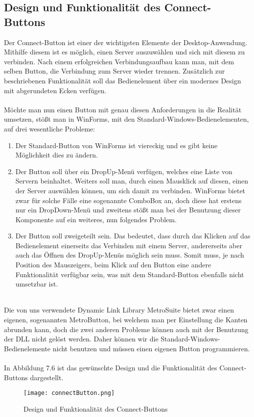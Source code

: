 \subsection{Design und Funktionalität des Connect-Buttons}

Der Connect-Button ist einer der wichtigsten Elemente der Desktop-Anwendung. Mithilfe diesem ist es möglich, einen Server auszuwählen und sich mit diesem zu verbinden. Nach einem erfolgreichen Verbindungsaufbau kann man, mit dem selben Button, die Verbindung zum Server wieder trennen. Zusätzlich zur beschriebenen Funktionalität soll das Bedienelement über ein modernes Design mit abgerundeten Ecken verfügen.
\\ \ \\
Möchte man nun einen Button mit genau diesen Anforderungen in die Realität umsetzen, stößt man in WinForms, mit den Standard-Windows-Bedienelementen, auf drei wesentliche Probleme:
\\
\begin{enumerate}
 \item Der Standard-Button von WinForms ist viereckig und es gibt keine Möglichkeit dies zu ändern.
 \item Der Button soll über ein DropUp-Menü verfügen, welches eine Liste von Servern beinhaltet. Weiters soll man, durch einen Mausklick auf diesen, einen der Server auswählen können, um sich damit zu verbinden. WinForms bietet zwar für solche Fälle eine sogenannte ComboBox an, doch diese hat erstens nur ein DropDown-Menü und zweitens stößt man bei der Benutzung dieser Komponente auf ein weiteres, nun folgendes Problem.
 \item Der Button soll zweigeteilt sein. Das bedeutet, dass durch das Klicken auf das Bedienelement einerseits das Verbinden mit einem Server, andererseits aber auch das Öffnen des DropUp-Menüs möglich sein muss. Somit muss, je nach Position des Mauszeigers, beim Klick auf den Button eine andere Funktionalität verfügbar sein, was mit dem Standard-Button ebenfalls nicht umsetzbar ist.
\end{enumerate}
\ \\
Die von uns verwendete Dynamic Link Library MetroSuite bietet zwar einen eigenen, sogenannten MetroButton, bei welchem man per Einstellung die Kanten abrunden kann, doch die zwei anderen Probleme können auch mit der Benutzung der DLL nicht gelöst werden. Daher können wir die Standard-Windows-Bedienelemente nicht benutzen und müssen einen eigenen Button programmieren.
\\ \ \\
In Abbildung 7.6 ist das gewünschte Design und die Funktionalität des Connect-Buttons dargestellt.
\begin{figure}[H]
    \centering
    \texttt{[image: connectButton.png]}
    \caption[Design und Funktionalität des Connect-Buttons]{Design und Funktionalität des Connect-Buttons} 
\end{figure}

